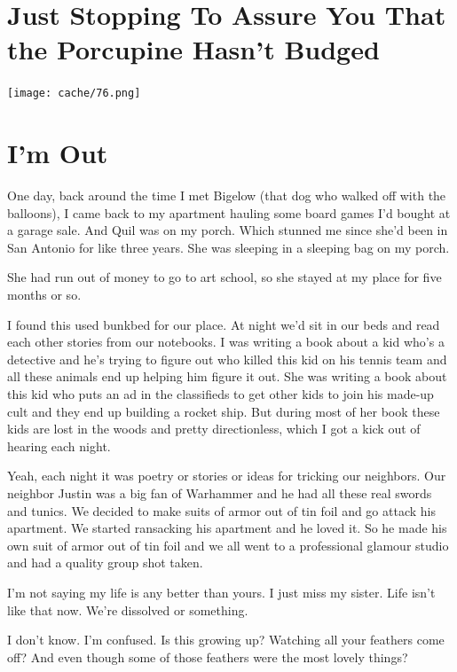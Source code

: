 \documentclass[12pt,twoside]{report}
\begin{document}
\newpage


\section{Just Stopping To Assure You That the Porcupine Hasn't Budged}


	\texttt{[image: cache/76.png]}


\section{I'm Out}



One day, back around the time I met Bigelow (that dog who walked off
with the balloons), I came back to my apartment hauling some board
games I'd bought at a garage sale.  And Quil was on my porch.  Which
stunned me since she'd been in San Antonio for like three years.  She
was sleeping in a sleeping bag on my porch.

She had run out of money to go to art school, so she stayed at my
place for five months or so.

I found this used bunkbed for our place.  At night we'd sit in our
beds and read each other stories from our notebooks.  I was writing a
book about a kid who's a detective and he's trying to figure out who
killed this kid on his tennis team and all these animals end up
helping him figure it out.  She was writing a book about this kid who
puts an ad in the classifieds to get other kids to join his made-up
cult and they end up building a rocket ship.  But during most of her
book these kids are lost in the woods and pretty directionless, which
I got a kick out of hearing each night.

Yeah, each night it was poetry or stories or ideas for tricking our
neighbors.  Our neighbor Justin was a big fan of Warhammer and he had
all these real swords and tunics.  We decided to make suits of armor
out of tin foil and go attack his apartment.  We started ransacking
his apartment and he loved it.  So he made his own suit of armor out
of tin foil and we all went to a professional glamour studio and had a
quality group shot taken.


I'm not saying my life is any better than yours.  I just miss my
sister.  Life isn't like that now. We're dissolved or something.

I don't know.  I'm confused.  Is this growing up?  Watching all your
feathers come off?  And even though some of those feathers were the
most lovely things?
\end{document}
